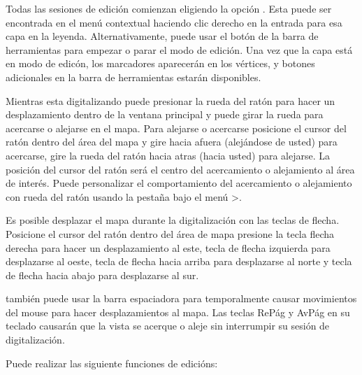 Todas las sesiones de edici\'on comienzan eligiendo la opci\'on .
Esta puede ser encontrada en el men\'u contextual haciendo clic derecho en la entrada para esa capa en la leyenda.
Alternativamente, puede usar el bot\'on 
 de la barra de herramientas para empezar o parar 
el modo de edici\'on. Una vez que la capa est\'a en modo de edic\'on, 
los marcadores aparecer\'an en los v\'ertices, y botones adicionales en la barra de herramientas 
estar\'an disponibles.


Mientras esta digitalizando puede presionar la rueda del rat\'on para hacer un desplazamiento dentro de la ventana
principal y puede girar la rueda para acercarse o alejarse en el mapa. Para alejarse o acercarse
posicione el cursor del rat\'on dentro del \'area del mapa y gire hacia afuera (alej\'andose de usted) 
para acercarse, gire la rueda del rat\'on hacia atras (hacia usted) para alejarse. La posici\'on del cursor del rat\'on ser\'a el centro 
del acercamiento o alejamiento al \'area de inter\'es. Puede personalizar el comportamiento 
del acercamiento o alejamiento con rueda del rat\'on usando la pesta\~na  bajo el men\'u
 >.  


Es posible desplazar el mapa  durante la digitalizaci\'on con las teclas de flecha. Posicione
el cursor del rat\'on dentro del \'area de mapa presione la tecla flecha derecha para hacer un
desplazamiento al este, tecla de flecha izquierda para desplazarse al oeste, tecla de flecha hacia arriba para desplazarse al norte y tecla de flecha hacia abajo 
para desplazarse al sur.

también puede usar la barra espaciadora para temporalmente causar movimientos del mouse para hacer desplazamientos 
al mapa. Las teclas ReP\'ag y AvP\'ag en su teclado causar\'an que la vista se acerque 
o aleje sin interrumpir su sesi\'on de digitalizaci\'on.

Puede realizar las siguiente funciones de edici\'ons:

